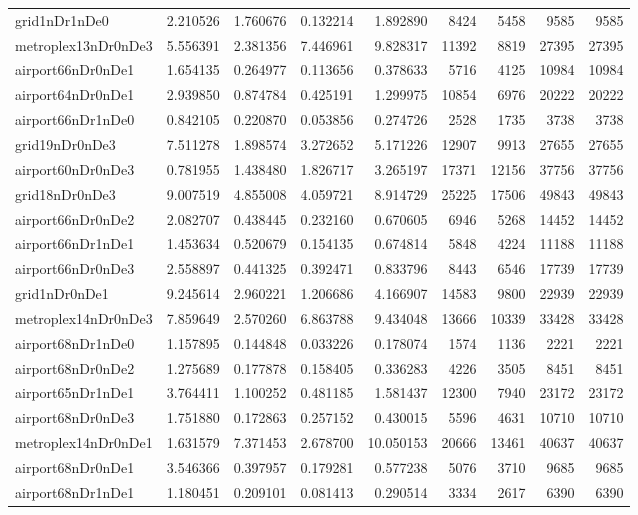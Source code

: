 \begin{longtable}{|l|r|r|r|r|r|r|r|r|}
grid1nDr1nDe0 & 2.210526 & 1.760676 & 0.132214 & 1.892890 & 8424 & 5458 & 9585 & 9585 \\
metroplex13nDr0nDe3 & 5.556391 & 2.381356 & 7.446961 & 9.828317 & 11392 & 8819 & 27395 & 27395 \\
airport66nDr0nDe1 & 1.654135 & 0.264977 & 0.113656 & 0.378633 & 5716 & 4125 & 10984 & 10984 \\
airport64nDr0nDe1 & 2.939850 & 0.874784 & 0.425191 & 1.299975 & 10854 & 6976 & 20222 & 20222 \\
airport66nDr1nDe0 & 0.842105 & 0.220870 & 0.053856 & 0.274726 & 2528 & 1735 & 3738 & 3738 \\
grid19nDr0nDe3 & 7.511278 & 1.898574 & 3.272652 & 5.171226 & 12907 & 9913 & 27655 & 27655 \\
airport60nDr0nDe3 & 0.781955 & 1.438480 & 1.826717 & 3.265197 & 17371 & 12156 & 37756 & 37756 \\
grid18nDr0nDe3 & 9.007519 & 4.855008 & 4.059721 & 8.914729 & 25225 & 17506 & 49843 & 49843 \\
airport66nDr0nDe2 & 2.082707 & 0.438445 & 0.232160 & 0.670605 & 6946 & 5268 & 14452 & 14452 \\
airport66nDr1nDe1 & 1.453634 & 0.520679 & 0.154135 & 0.674814 & 5848 & 4224 & 11188 & 11188 \\
airport66nDr0nDe3 & 2.558897 & 0.441325 & 0.392471 & 0.833796 & 8443 & 6546 & 17739 & 17739 \\
grid1nDr0nDe1 & 9.245614 & 2.960221 & 1.206686 & 4.166907 & 14583 & 9800 & 22939 & 22939 \\
metroplex14nDr0nDe3 & 7.859649 & 2.570260 & 6.863788 & 9.434048 & 13666 & 10339 & 33428 & 33428 \\
airport68nDr1nDe0 & 1.157895 & 0.144848 & 0.033226 & 0.178074 & 1574 & 1136 & 2221 & 2221 \\
airport68nDr0nDe2 & 1.275689 & 0.177878 & 0.158405 & 0.336283 & 4226 & 3505 & 8451 & 8451 \\
airport65nDr1nDe1 & 3.764411 & 1.100252 & 0.481185 & 1.581437 & 12300 & 7940 & 23172 & 23172 \\
airport68nDr0nDe3 & 1.751880 & 0.172863 & 0.257152 & 0.430015 & 5596 & 4631 & 10710 & 10710 \\
metroplex14nDr0nDe1 & 1.631579 & 7.371453 & 2.678700 & 10.050153 & 20666 & 13461 & 40637 & 40637 \\
airport68nDr0nDe1 & 3.546366 & 0.397957 & 0.179281 & 0.577238 & 5076 & 3710 & 9685 & 9685 \\
airport68nDr1nDe1 & 1.180451 & 0.209101 & 0.081413 & 0.290514 & 3334 & 2617 & 6390 & 6390 \\

\end{longtable}
